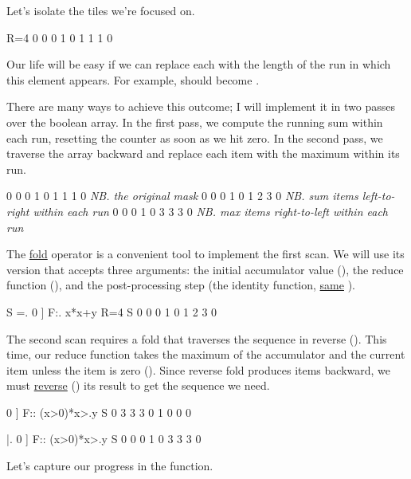 \documentclass{article}
\begin{document}
Let's isolate the tiles we're focused on.

\begin{code}[j]
   R=4
0 0 0 1 0 1 1 1 0
\end{code}

Our life will be easy if we can replace each  with the length of the run in which this element appears.
For example,  should become .

There are many ways to achieve this outcome; I will implement it in two passes over the boolean array.
In the first pass, we compute the running sum within each run, resetting the counter as soon as we hit zero.
In the second pass, we traverse the array backward and replace each item with the maximum within its run.

\begin{code}
0 0 0 1 0 1 1 1 0  \emph{NB. the original mask}
0 0 0 1 0 1 2 3 0  \emph{NB. sum items left-to-right within each run }
0 0 0 1 0 3 3 3 0  \emph{NB. max items right-to-left within each run }
\end{code}

The \href{https://code.jsoftware.com/wiki/Vocabulary/fcap}{fold} operator is a convenient tool to implement the first scan.
We will use its version that accepts three arguments: the initial accumulator value (), the reduce function (), and the post-processing step (the identity function, \href{https://code.jsoftware.com/wiki/Vocabulary/squarert}{same} \code{]}).

\begin{code}[j]
   S =. 0 ] F:. {{x*x+y}} R=4
   S
0 0 0 1 0 1 2 3 0
\end{code}

The second scan requires a fold that traverses the sequence in reverse ().
This time, our reduce function takes the maximum of the accumulator and the current item unless the item is zero ().
Since reverse fold produces items backward, we must \href{https://code.jsoftware.com/wiki/Vocabulary/bardot}{reverse} () its result to get the sequence we need.

\begin{code}[j]
   0 ] F:: {{(x>0)*x>.y}} S
0 3 3 3 0 1 0 0 0

   |. 0 ] F:: {{(x>0)*x>.y}} S
0 0 0 1 0 3 3 3 0
\end{code}

Let's capture our progress in the  function.
\end{document}
